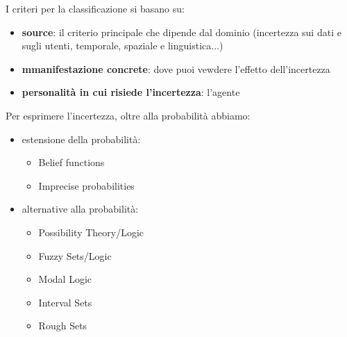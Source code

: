 I criteri per la classificazione si basano su:
\begin{itemize}
    \item \textbf{source}: il criterio principale che dipende dal dominio (incertezza 
    sui dati e sugli utenti, temporale, spaziale e linguistica$\dots$)
    \item \textbf{mmanifestazione concrete}: dove puoi vewdere l'effetto dell'incertezza
    \item \textbf{personalità in cui risiede l'incertezza}: l'agente
\end{itemize}

Per esprimere l'incertezza, oltre alla probabilità abbiamo:
\begin{itemize}
    \item estensione della probabilità:
     \begin{itemize}
        \item Belief functions
        \item Imprecise probabilities
    \end{itemize}
    \item alternative alla probabilità:
    \begin{itemize}
        \item Possibility Theory/Logic
        \item Fuzzy Sets/Logic
        \item Modal Logic
        \item Interval Sets
        \item Rough Sets
    \end{itemize}
\end{itemize}